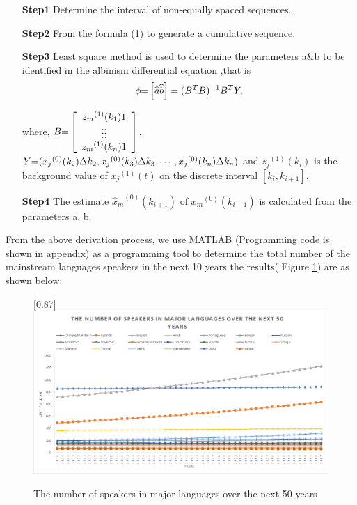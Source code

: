 \begin{enumerate}
 \item[\textbf{Step1}]  Determine the interval of non-equally spaced sequences.
 \item[\textbf{Step2}] From the formula (1) to generate a cumulative sequence.
 \item[\textbf{Step3}] Least square method is used to determine the parameters a\&b to be identified in the albinism differential equation ,that is
		 \begin{equation}
		 \phi {\rm{ = }}\left[ {\widehat a\widehat b} \right] = {({B^T}B)^{ - 1}}{B^T}Y ,
		 \end{equation}
		 
	where, $B{\rm{ = }}\left[ {\begin{array}{*{20}{c}}
		{{z_m}^{(1)}({k_1})}1\\
		\vdots  \vdots \\
		{{z_m}^{(1)}({k_n})}1
		\end{array}} \right]$, $Y{\rm{ = }}({x_j}^{(0)}({k_2})\Delta {k_2},{x_j}^{(0)}({k_3})\Delta {k_3}, \cdots ,{x_j}^{(0)}({k_n})\Delta {k_n})$ and ${z_j}^{(1)}({k_i})$  is the background value  of ${x_j}^{(1)}(t)$  on the discrete interval  $\left[ {{k_i},{k_{i + 1}}} \right]$.
  \item[\textbf{Step4}] The estimate ${\widehat x_m}^{(0)}({k_{i + 1}})$ of ${x_m}^{(0)}({k_{i + 1}})$  is calculated from the parameters a, b.
\end{enumerate}

From the above derivation process, we use MATLAB (Programming code is shown in appendix) as a programming tool to determine the total number of the mainstream languages speakers in the next 10 years the results( Figure \ref{fig:next50}) are as shown below:
     

\begin{figure}[H]
	\centering
	 \scalebox{0.87}[0.87]{%
	\includegraphics[width=1\linewidth]{figures/next50number}
}
	\caption{The number of speakers in major languages over the next 50 years}
	\label{fig:next50}
\end{figure}

